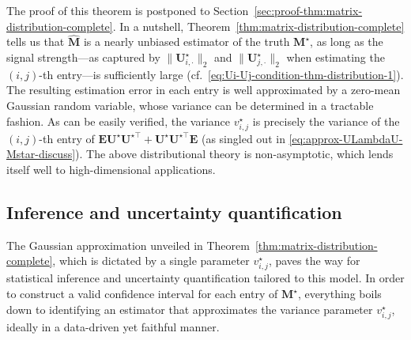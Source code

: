 %
The proof of this theorem is postponed to Section~\ref{sec:proof-thm:matrix-distribution-complete}. 
In a nutshell, Theorem~\ref{thm:matrix-distribution-complete} tells us that $\widehat{\bm{M}}$ is a nearly unbiased estimator of the truth $\bm{M}^{\star}$, as long as the signal strength---as captured by $\|\bm{U}^{\star}_{i,\cdot}\|_2$ and $\|\bm{U}^{\star}_{j,\cdot}\|_2$ when estimating the $(i,j)$-th entry---is sufficiently large (cf.~\eqref{eq:Ui-Uj-condition-thm-distribution-1}).  
The resulting estimation error in each entry is well approximated by a zero-mean Gaussian random variable, 
whose variance can be determined in a tractable fashion.  
As can be easily verified, the variance $v_{i,j}^{\star}$ is precisely the variance of the $(i,j)$-th entry of $\bm{E}\bm{U}^{\star}\bm{U}^{\star\top}+\bm{U}^{\star}\bm{U}^{\star\top}\bm{E}$ (as singled out in \eqref{eq:approx-ULambdaU-Mstar-discuss}). 
The above distributional theory is non-asymptotic, 
which lends itself well to high-dimensional applications.  





\subsection{Inference and uncertainty quantification}
\label{sec:UQ-general}



The Gaussian approximation unveiled in Theorem~\ref{thm:matrix-distribution-complete},
which is dictated by a single parameter ${v}_{i,j}^{\star}$, 
paves the way for statistical inference and uncertainty quantification tailored to this model. 
In order to construct a valid confidence interval for each entry of $\bm{M}^{\star}$, 
everything boils down to identifying an estimator that approximates the variance parameter ${v}_{i,j}^{\star}$, ideally in a data-driven yet faithful manner. 

